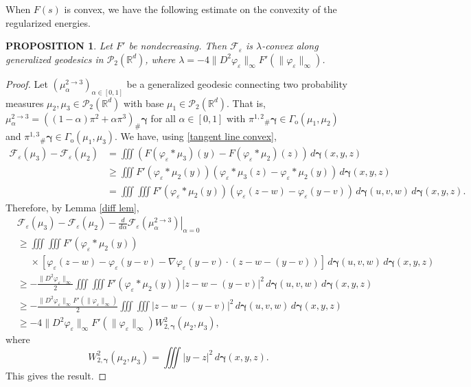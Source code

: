 \documentclass[11pt,leqno]{amsart}
\newtheorem{prop}[thm]{PROPOSITION}
\theoremstyle{definition}
\newcommand{\bes}{\begin{equation*}}
\newcommand{\ees}{\end{equation*}}
\newcommand{\R}{{\mathord{\mathbb R}}}
\newcommand{\Rd}{{\mathord{\mathbb R}^d}}
\newcommand{\grad}{\nabla}
\newcommand{\F}{\mathcal{F}}
\def\P{{\mathcal P}}
\def\e{\varepsilon}
\newcommand{\bgamma}{\boldsymbol{\gamma}}
\def\F{\mathcal{F}}
\begin{document}
When $F(s)$ is convex, we have the following estimate on the convexity of the regularized energies.
\begin{prop}\label{thm:conv}
	Let $F'$ be nondecreasing. Then $\F_\e$ is $\lambda$-convex along generalized geodesics in $\P_2(\Rd)$, where $\lambda = - 4 \|D^2 \varphi_\e \|_\infty F'(\|\varphi_\e\|_\infty)$.
\end{prop}

\begin{proof}
	 Let $(\mu_\alpha^{2\to3})_{\alpha\in[0,1]}$ be a generalized geodesic connecting two probability measures $\mu_2,\mu_3\in\P_2(\R^d)$ with base $\mu_1\in\P_2(\R^d)$. That is, $\mu_\alpha^{2\to3} = \left((1-\alpha)\pi^2+\alpha\pi^3\right)_\# \bgamma$ for all $\alpha \in[0,1]$ with ${\pi^{1,2}}_\#\bgamma\in\Gamma_\mathrm{o}(\mu_1,\mu_2)$ and ${\pi^{1,3}}_\#\bgamma\in\Gamma_\mathrm{o}(\mu_1,\mu_3)$. We have, using \eqref{tangent line convex},
\begin{align*}
	\F_\e(\mu_3) - \F_\e(\mu_2) &= \iiint \left(F(\varphi_\e*\mu_3)(y) - F(\varphi_\e*\mu_2)(z) \right)  \,d\bgamma(x,y,z)\\
	&\geq \iiint F'(\varphi_\e*\mu_2(y)) \left( \varphi_\e*\mu_3(z) - \varphi_\e*\mu_2(y) \right)\,d\bgamma(x,y,z) \\
	&= \iiint \iiint F'(\varphi_\e*\mu_2(y)) \left( \varphi_\e(z-w) - \varphi_\e(y-v) \right)\,d\bgamma(u,v,w)\,d\bgamma(x,y,z).
\end{align*}
Therefore, by Lemma \ref{diff lem},
\begin{align*}
	&\F_\e(\mu_3) - \F_\e(\mu_2) - \left. \frac{d}{d \alpha}\F_\e(\mu_\alpha^{2\to3}) \right|_{\alpha = 0} \\
 	&\geq \iiint \iiint F'(\varphi_\e*\mu_2(y)) \\
 	&\phantom{{}={}}\times \left[ \varphi_\e(z-w) - \varphi_\e(y-v) - \grad \varphi_\e(y-v) \cdot (z-w-(y-v)) \right]\,d \bgamma(u,v,w)\,d \bgamma(x,y,z)\\
	&\geq -\frac{\|D^2 \varphi_\e\|_\infty}{2} \iiint \iiint F'(\varphi_\e*\mu_2(y)) |z-w - (y-v)|^2 \,d \bgamma(u,v,w)\,d \bgamma(x,y,z) \\
	&\geq -\frac{\|D^2 \varphi_\e\|_\infty F'(\|\varphi_\e\|_\infty)}{2} \iiint \iiint |z-w - (y-v)|^2\,d \bgamma(u,v,w)\,d \bgamma(x,y,z) \\
	&\geq -4\|D^2 \varphi_\e\|_\infty F'(\|\varphi_\e\|_\infty) W_{2,\bgamma}^2(\mu_2,\mu_3),
 \end{align*}
where 
\bes
	W_{2,\bgamma}^2(\mu_2,\mu_3) = \iiint |y-z|^2 \,d\bgamma(x,y,z).
\ees
This gives the result.
\end{proof}
\end{document}
